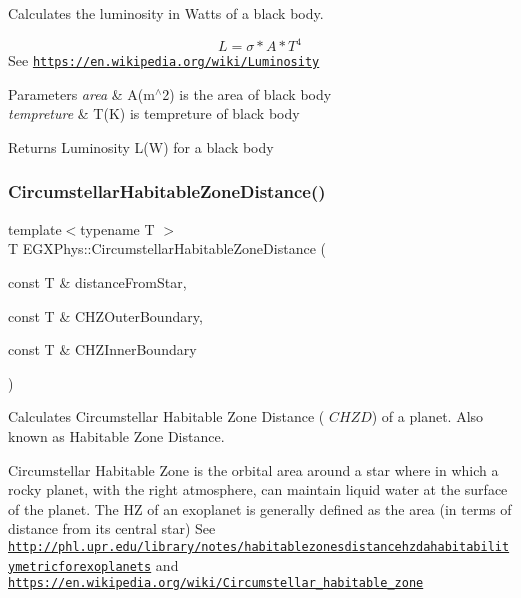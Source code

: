 Calculates the luminosity in Watts of a black body. 

\[L=\sigma*A*T^4\] See \href{https://en.wikipedia.org/wiki/Luminosity}{\tt https\+://en.\+wikipedia.\+org/wiki/\+Luminosity}


\begin{DoxyParams}{Parameters}
{\em area} & A(m$^\wedge$2) is the area of black body \\
\hline
{\em tempreture} & T(\+K) is tempreture of black body \\
\hline
\end{DoxyParams}
\begin{DoxyReturn}{Returns}
Luminosity L(\+W) for a black body 
\end{DoxyReturn}
\mbox{\label{group___astrophysics_gacf3a720793cdb27f6d93b170b44e81be}} 
\subsubsection{\texorpdfstring{Circumstellar\+Habitable\+Zone\+Distance()}{CircumstellarHabitableZoneDistance()}}
{\footnotesize\ttfamily template$<$typename T $>$ \\
T E\+G\+X\+Phys\+::\+Circumstellar\+Habitable\+Zone\+Distance (\begin{DoxyParamCaption}\item[{const T \&}]{distance\+From\+Star,  }\item[{const T \&}]{C\+H\+Z\+Outer\+Boundary,  }\item[{const T \&}]{C\+H\+Z\+Inner\+Boundary }\end{DoxyParamCaption})}



Calculates Circumstellar Habitable Zone Distance ( $CHZD$) of a planet. Also known as Habitable Zone Distance. 

Circumstellar Habitable Zone is the orbital area around a star where in which a rocky planet, with the right atmosphere, can maintain liquid water at the surface of the planet. The HZ of an exoplanet is generally defined as the area (in terms of distance from its central star) See \href{http://phl.upr.edu/library/notes/habitablezonesdistancehzdahabitabilitymetricforexoplanets}{\tt http\+://phl.\+upr.\+edu/library/notes/habitablezonesdistancehzdahabitabilitymetricforexoplanets} and \href{https://en.wikipedia.org/wiki/Circumstellar_habitable_zone}{\tt https\+://en.\+wikipedia.\+org/wiki/\+Circumstellar\+\_\+habitable\+\_\+zone}

